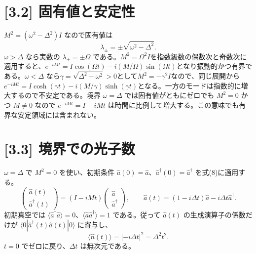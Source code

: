 \documentclass[11pt,a4paper]{article}
\begin{document}
\section*{[3.2] 固有値と安定性}
$M^2=(\omega^2-\Delta^2)I$ なので固有値は
\[
\boxed{\lambda_\pm=\pm\sqrt{\omega^2-\Delta^2}}.
\]
$\omega>\Delta$ なら実数の $\lambda_\pm=\pm\Omega$ である。$M^2=\Omega^2I$を指数級数の偶数次と奇数次に適用すると、$e^{-iMt}=I\cos(\Omega t)-i(M/\Omega)\sin(\Omega t)$となり振動的かつ有界である。$\omega<\Delta$ なら$\gamma=\sqrt{\Delta^2-\omega^2}>0$として$M^2=-\gamma^2I$なので、同じ展開から$e^{-iMt}=I\cosh(\gamma t)-i(M/\gamma)\sinh(\gamma t)$となる。一方のモードは指数的に増大するので不安定である。境界 $\omega=\Delta$ では固有値がともにゼロでも $M^2=0$ かつ $M\ne0$ なので $e^{-iMt}=I-iMt$ は時間に比例して増大する。この意味でも有界な安定領域には含まれない。

\section*{[3.3] 境界での光子数}
$\omega=\Delta$ で $M^2=0$ を使い、初期条件 $\hat a(0)=\hat a$、$\hat a^\dagger(0)=\hat a^\dagger$ を式(8)に適用する。
\[
\begin{pmatrix}\hat a(t)\\\hat a^\dagger(t)\end{pmatrix}
=(I-iMt)\begin{pmatrix}\hat a\\\hat a^\dagger\end{pmatrix},
\qquad
\hat a(t)=(1-i\Delta t)\hat a-i\Delta t\hat a^\dagger.
\]
初期真空では $\langle\hat a^\dagger\hat a\rangle=0$、$\langle\hat a\hat a^\dagger\rangle=1$ である。従って $\hat a(t)$ の生成演算子の係数だけが $\langle0|\hat a^\dagger(t)\hat a(t)|0\rangle$ に寄与し、
\[
\boxed{\langle\hat n(t)\rangle=|{-i\Delta t}|^2=\Delta^2t^2}.
\]
$t=0$ でゼロに戻り、$\Delta t$ は無次元である。
\end{document}
